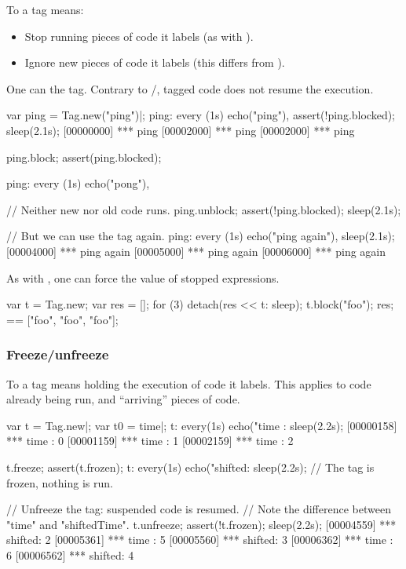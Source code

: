 To  a tag means:
\begin{itemize}
\item Stop running pieces of code it labels (as with
  ).
\item Ignore new pieces of code it labels (this differs from
  ).
\end{itemize}

One can  the tag.  Contrary to
/, tagged code does not resume the
execution.

\begin{urbiscript}[firstnumber=1]
var ping = Tag.new("ping")|;
ping:
  every (1s)
    echo("ping"),
assert(!ping.blocked);
sleep(2.1s);
[00000000] *** ping
[00002000] *** ping
[00002000] *** ping

ping.block;
assert(ping.blocked);

ping:
  every (1s)
    echo("pong"),

// Neither new nor old code runs.
ping.unblock;
assert(!ping.blocked);
sleep(2.1s);

// But we can use the tag again.
ping:
  every (1s)
    echo("ping again"),
sleep(2.1s);
[00004000] *** ping again
[00005000] *** ping again
[00006000] *** ping again
\end{urbiscript}

As with , one can force the value of stopped
expressions.

\begin{urbiassert}[firstnumber=1]
{
  var t = Tag.new;
  var res = [];
  for (3)
    detach(res << {t: sleep});
  t.block("foo");
  res;
}
==
["foo", "foo", "foo"];
\end{urbiassert}

\subsubsection{Freeze/unfreeze}
\label{sec:specs:tag:freeze}

To  a tag means holding the execution of code it labels.
This applies to code already being run, and ``arriving'' pieces of code.

\begin{urbiscript}[firstnumber=1]
var t = Tag.new|;
var t0 = time|;
t: every(1s) echo("time   : %
sleep(2.2s);
[00000158] *** time   : 0
[00001159] *** time   : 1
[00002159] *** time   : 2

t.freeze;
assert(t.frozen);
t: every(1s) echo("shifted: %
sleep(2.2s);
// The tag is frozen, nothing is run.

// Unfreeze the tag: suspended code is resumed.
// Note the difference between "time" and "shiftedTime".
t.unfreeze;
assert(!t.frozen);
sleep(2.2s);
[00004559] *** shifted: 2
[00005361] *** time   : 5
[00005560] *** shifted: 3
[00006362] *** time   : 6
[00006562] *** shifted: 4
\end{urbiscript}


